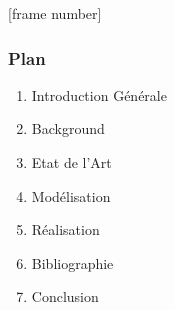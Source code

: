 




[frame number]{
	\begin{frame}[plain]
	\begin{block}{}
	\titlepage
	\end{block}
	\end{frame}
}


	
	


	\begin{frame}[plain]
		\begin{block}{}
		\frametitle{\caasifont Plan}
			\begin{enumerate}
				\vspace{0.8em}
				\item Introduction Générale \vspace{1em}
				
				\item Background \vspace{1em}
				
				\item Etat de l'Art \vspace{1em}
				
				\item Modélisation \vspace{1em}
				\item Réalisation	 \vspace{1em}		
				\item Bibliographie	 \vspace{1em}	
				\item Conclusion  \vspace{0.8em}	
			\end{enumerate}
		\end{block}
	\end{frame}


